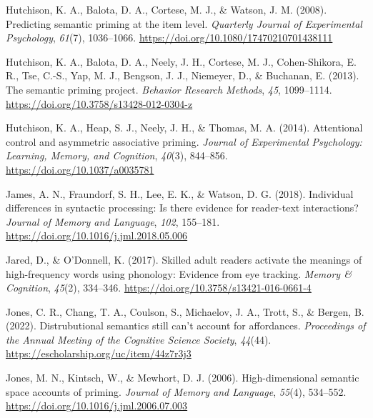 \documentclass[
  12pt,
  man,floatsintext]{apa7}
\newlength{\cslhangindent}
\newlength{\cslentryspacingunit} %
\newenvironment{CSLReferences}[2] %
 {%
  \setlength{\parindent}{0pt}
  \ifodd #1
  \let\oldpar\par
  \def\par{\hangindent=\cslhangindent\oldpar}
  \fi
  \setlength{\parskip}{#2\cslentryspacingunit}
 }%
 {}
\begin{document}
\begin{CSLReferences}{1}{0}
\leavevmode{}%
Hutchison, K. A., Balota, D. A., Cortese, M. J., \& Watson, J. M. (2008). Predicting semantic priming at the item level. \emph{Quarterly Journal of Experimental Psychology}, \emph{61}(7), 1036--1066. \url{https://doi.org/10.1080/17470210701438111}

\leavevmode{}%
Hutchison, K. A., Balota, D. A., Neely, J. H., Cortese, M. J., Cohen-Shikora, E. R., Tse, C.-S., Yap, M. J., Bengson, J. J., Niemeyer, D., \& Buchanan, E. (2013). The semantic priming project. \emph{Behavior Research Methods}, \emph{45}, 1099--1114. \url{https://doi.org/10.3758/s13428-012-0304-z}

\leavevmode{}%
Hutchison, K. A., Heap, S. J., Neely, J. H., \& Thomas, M. A. (2014). Attentional control and asymmetric associative priming. \emph{Journal of Experimental Psychology: Learning, Memory, and Cognition}, \emph{40}(3), 844--856. \url{https://doi.org/10.1037/a0035781}

\leavevmode{}%
James, A. N., Fraundorf, S. H., Lee, E. K., \& Watson, D. G. (2018). Individual differences in syntactic processing: {Is} there evidence for reader-text interactions? \emph{Journal of Memory and Language}, \emph{102}, 155--181. \url{https://doi.org/10.1016/j.jml.2018.05.006}

\leavevmode{}%
Jared, D., \& O'Donnell, K. (2017). Skilled adult readers activate the meanings of high-frequency words using phonology: {Evidence} from eye tracking. \emph{Memory \& Cognition}, \emph{45}(2), 334--346. \url{https://doi.org/10.3758/s13421-016-0661-4}

\leavevmode{}%
Jones, C. R., Chang, T. A., Coulson, S., Michaelov, J. A., Trott, S., \& Bergen, B. (2022). Distrubutional semantics still can't account for affordances. \emph{Proceedings of the Annual Meeting of the Cognitive Science Society}, \emph{44}(44). \url{https://escholarship.org/uc/item/44z7r3j3}

\leavevmode{}%
Jones, M. N., Kintsch, W., \& Mewhort, D. J. (2006). High-dimensional semantic space accounts of priming. \emph{Journal of Memory and Language}, \emph{55}(4), 534--552. \url{https://doi.org/10.1016/j.jml.2006.07.003}


\end{CSLReferences}
\end{document}
